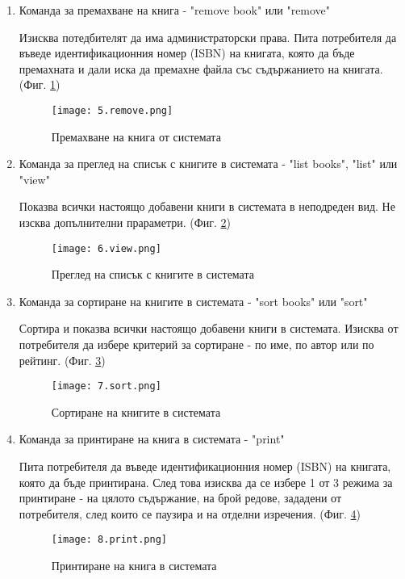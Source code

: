 \begin{enumerate}
    \item Команда за премахване на книга - "remove book" или "remove"
    
    Изисква потедбителят да има администраторски права. Пита потребителя да въведе идентификационния номер (ISBN) на книгата, която да бъде премахната и дали иска да премахне файла със съдържанието на книгата. (Фиг. \ref{fig:remove})
    \begin{figure}[H]
        \texttt{[image: 5.remove.png]}
        \centering
        \caption{Премахване на книга от системата}
        \label{fig:remove}
    \end{figure}
    

    \item Команда за преглед на списък с книгите в системата - "list books", "list" или "view"
    
    Показва всички настоящо добавени книги в системата в неподреден вид. Не изсква допълнителни прараметри. (Фиг. \ref{fig:view})
    \begin{figure}[H]
        \texttt{[image: 6.view.png]}
        \centering
        \caption{Преглед на списък с книгите в системата}
        \label{fig:view}
    \end{figure}

    \item Команда за сортиране на книгите в системата - "sort books" или "sort"

    Сортира и показва всички настоящо добавени книги в системата. Изисква от потребителя да избере критерий за сортиране - по име, по автор или по рейтинг. (Фиг. \ref{fig:sort})
    \begin{figure}[H]
        \texttt{[image: 7.sort.png]}
        \centering
        \caption{Сортиране на книгите в системата}
        \label{fig:sort}
    \end{figure}

    \item Команда за принтиране на книга в системата - "print"
     
    Пита потребителя да въведе идентификационния номер (ISBN) на книгата, която да бъде принтирана. След това изисква да се избере 1 от 3 режима за принтиране - на цялото съдържание, на брой редове, зададени от потребителя, след които се паузира и на отделни изречения. (Фиг. \ref{fig:print})
    \begin{figure}[H]
        \texttt{[image: 8.print.png]}
        \centering
        \caption{Принтиране на книга в системата}
        \label{fig:print}
    \end{figure}
\end{enumerate}